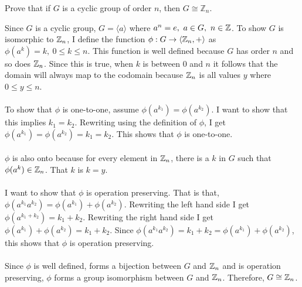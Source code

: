\documentclass[titlepage]{article}
\begin{document}
\begin{problem}{2}
Prove that if $G$ is a cyclic group of order $n$, then $G \cong \mathbb{Z}_n$.
\end{problem}
\begin{solution}
Since $G$ is a cyclic group, $G = \langle a \rangle$ where $a^n = e, \ a\in G, \ n\in \mathbb{Z}$. To show $G$ is isomorphic to $\mathbb{Z}_n$, I define the function $\phi: G \rightarrow \langle \mathbb{Z}_n, + \rangle$ as $\phi(a^k) = k, \ 0 \leq k \leq n$. This function is well defined because $G$ has order $n$ and so does $\mathbb{Z}_n$. Since this is true, when $k$ is between 0 and $n$ it follows that the domain will always map to the codomain because $\mathbb{Z}_n$ is all values $y$ where $0 \leq y \leq n$.
\\ \\
To show that $\phi$ is one-to-one, assume $\phi(a^{k_1}) = \phi(a^{k_2})$. I want to show that this implies $k_1 = k_2$. Rewriting using the definition of $\phi$, I get $\phi(a^{k_1}) = \phi(a^{k_2}) = k_1 = k_2$. This shows that $\phi$ is one-to-one. 
\\ \\
$\phi$ is also onto because for every element in $\mathbb{Z}_n$, there is a $k$ in $G$ such that $\phi(a^k) \in \mathbb{Z}_n$. That $k$ is $k=y$.
\\ \\
I want to show that $\phi$ is operation preserving. That is that, $\phi(a^{k_1} a^{k_2}) = \phi(a^{k_1}) + \phi(a^{k_2})$. Rewriting the left hand side I get $\phi(a^{k_1 + k_2}) = k_1 + k_2$. Rewriting the right hand side I get $\phi(a^{k_1}) + \phi(a^{k_2}) = k_1 + k_2$. Since $\phi(a^{k_1} a^{k_2}) = k_1 +k_2  = \phi(a^{k_1}) + \phi(a^{k_2})$, this shows that $\phi$ is operation preserving.
\\ \\
Since $\phi$ is well defined, forms a bijection between $G$ and $\mathbb{Z}_n$ and is operation preserving, $\phi$ forms a group isomorphism between $G$ and $\mathbb{Z}_n$. Therefore, $G \cong \mathbb{Z}_n$.
\end{solution}
\end{document}
